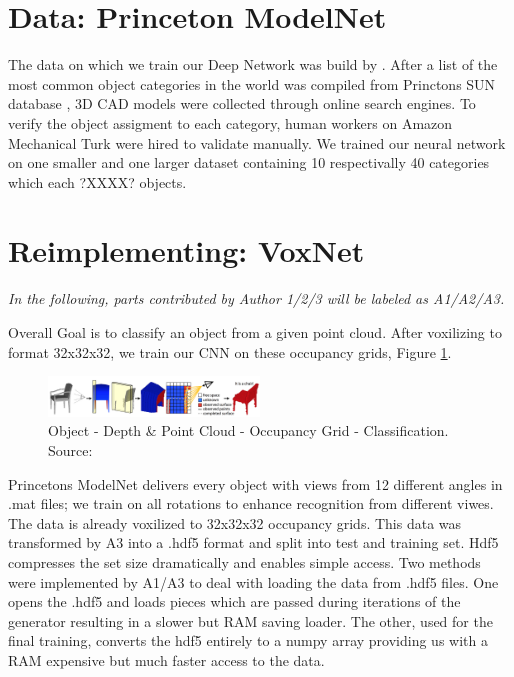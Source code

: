 \documentclass[10pt,twocolumn,letterpaper]{article}
\begin{document}
\section{Data: Princeton ModelNet}

The data on which we train our Deep Network was build by \cite{shape}. After a list of the most
common object categories in the world was compiled from Princtons SUN database \cite{sun}, 3D CAD models were collected through online 
search engines. To verify the object assigment to each category, human workers on Amazon Mechanical Turk were hired to validate manually. We trained our neural network on one smaller and one larger dataset containing 10 respectivally 40 categories which each ?XXXX? objects.

\section{Reimplementing: VoxNet \cite{maturana_iros_2015}}

\textit{In the following, parts contributed by Author 1/2/3 will be labeled 
as A1/A2/A3.}

Overall Goal is to classify an object from a given point cloud. After voxilizing to format 32x32x32, we train our CNN on these occupancy grids, Figure \ref{fig:algo}.

\begin{figure}[h]
	\label{fig:algo}
	\centering
	\includegraphics[width=0.5\textwidth]{algo}
	\caption{ \newline Object - Depth \& Point Cloud - Occupancy Grid - Classification. Source: \cite{shape}}
\end{figure}

Princetons ModelNet delivers every object with views from 12 different angles in .mat files; we train on all rotations to enhance recognition from 
different viwes. The data is already voxilized to 32x32x32 occupancy grids.
This data was transformed by A3 into a .hdf5 format and split into test and training set. Hdf5 compresses the set size dramatically and enables simple access.
Two methods were implemented by A1/A3 to deal with loading the data from .hdf5 files. One opens the .hdf5 and loads pieces which are passed during iterations of the generator resulting in a slower but RAM saving loader. The other, used for the final training, converts the hdf5 entirely to a numpy array providing us with a RAM expensive but much faster access to the data.
\end{document}
